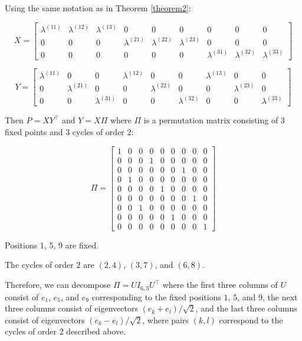 \documentclass[
  11pt,
]{article}
\begin{document}
\begin{example}[$K = 3$] Using the same notation as in Theorem \ref{theorem2}:

$$X = \begin{bmatrix} 
\lambda^{(11)} & \lambda^{(12)} & \lambda^{(13)} & 0 & 0 & 0 & 0 & 0 & 0 \\
0 & 0 & 0 & \lambda^{(21)} & \lambda^{(22)} & \lambda^{(23)} & 0 & 0 & 0 \\
0 & 0 & 0 & 0 & 0 & 0 & \lambda^{(31)} & \lambda^{(32)} & \lambda^{(33)}
\end{bmatrix}$$

$$Y = \begin{bmatrix} 
\lambda^{(11)} & 0 & 0 & \lambda^{(12)} & 0 & 0 & \lambda^{(13)} & 0 & 0 \\
0 & \lambda^{(21)} & 0 & 0 & \lambda^{(22)} & 0 & 0 & \lambda^{(23)} & 0 \\
0 & 0 & \lambda^{(31)} & 0 & 0 & \lambda^{(32)} & 0 & 0 & \lambda^{(33)}
\end{bmatrix}$$

Then $P = X Y^\top$ and $Y = X \Pi$ where $\Pi$ is a permutation matrix 
consisting of $3$ fixed points and $3$ cycles of order 2:

$$\Pi = \begin{bmatrix} 
1 & 0 & 0 & 0 & 0 & 0 & 0 & 0 & 0 \\
0 & 0 & 0 & 1 & 0 & 0 & 0 & 0 & 0 \\
0 & 0 & 0 & 0 & 0 & 0 & 1 & 0 & 0 \\
0 & 1 & 0 & 0 & 0 & 0 & 0 & 0 & 0 \\
0 & 0 & 0 & 0 & 1 & 0 & 0 & 0 & 0 \\
0 & 0 & 0 & 0 & 0 & 0 & 0 & 1 & 0 \\
0 & 0 & 1 & 0 & 0 & 0 & 0 & 0 & 0 \\
0 & 0 & 0 & 0 & 0 & 1 & 0 & 0 & 0 \\
0 & 0 & 0 & 0 & 0 & 0 & 0 & 0 & 1
\end{bmatrix}$$

\item Positions 1, 5, 9 are fixed.

\item The cycles of order 2 are $(2, 4)$, $(3, 7)$, and $(6, 8)$.
    
Therefore, we can decompose $\Pi = U I_{6, 3} U^\top$ where the first three 
columns of $U$ consist of $e_1$, $e_5$, and $e_9$ corresponding to the fixed 
positions $1$, $5$, and $9$, the next three columns consist of eigenvectors 
$(e_k + e_l) / \sqrt{2}$, and the last three columns consist of eigenvectors 
$(e_k - e_l) / \sqrt{2}$, where pairs $(k, l)$ correspond to the cycles of 
order 2 described above.


\end{example}
\end{document}
